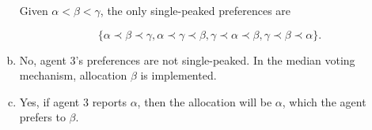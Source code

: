 \documentclass{article}
\begin{document}
\begin{enumerate}[(a)]
	Given $\alpha < \beta < \gamma$, the only single-peaked preferences are

	$$\{ \alpha \prec \beta \prec \gamma, \alpha \prec \gamma \prec \beta, \gamma \prec \alpha \prec \beta, \gamma \prec \beta \prec \alpha \}.$$


	\item

	No, agent 3's preferences are not single-peaked. In the median voting mechanism, allocation $\beta$ is implemented.

	\item

	Yes, if agent 3 reports $\alpha$, then the allocation will be $\alpha$, which the agent prefers to $\beta$.

\end{enumerate}
\end{document}
